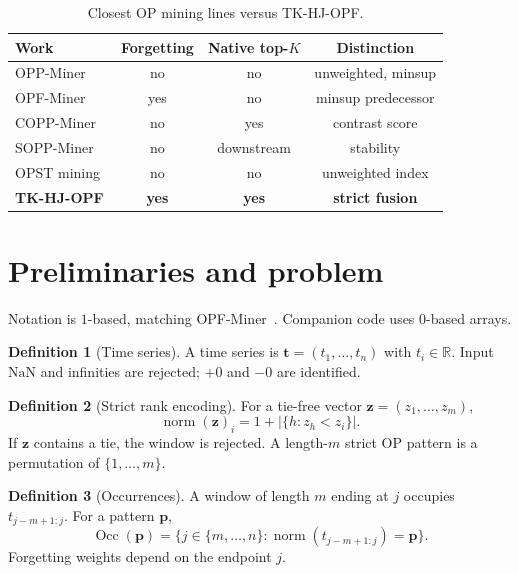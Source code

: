\documentclass[preprint,12pt]{elsarticle}
\DeclareMathOperator{\norm}{norm}
\DeclareMathOperator{\Occ}{Occ}
\theoremstyle{plain}
\theoremstyle{definition}
\newtheorem{definition}{Definition}
\theoremstyle{remark}
\begin{document}
\begin{table}[t]
\caption{Closest OP mining lines versus TK-HJ-OPF.}
\label{tab:related}
\centering
\footnotesize
\begin{tabular}{@{}lccc@{}}
\toprule
Work & Forgetting & Native top-$K$ & Distinction \\
\midrule
OPP-Miner~\cite{Wu2023OPP} & no & no & unweighted, minsup \\
OPF-Miner~\cite{Li2024OPF} & yes & no & minsup predecessor \\
COPP-Miner~\cite{Wu2024COPP} & no & yes & contrast score \\
SOPP-Miner~\cite{Zhang2026SOPP} & no & downstream & stability \\
OPST mining~\cite{Li2026Indexing} & no & no & unweighted index \\
\textbf{TK-HJ-OPF} & \textbf{yes} & \textbf{yes} & \textbf{strict fusion} \\
\bottomrule
\end{tabular}
\end{table}

\section{Preliminaries and problem}
\label{sec:prelim}

Notation is $1$-based, matching OPF-Miner~\cite{Li2024OPF}. Companion code uses $0$-based arrays.

\begin{definition}[Time series]
A time series is $\mathbf{t}=(t_1,\ldots,t_n)$ with $t_i\in\mathbb{R}$. Input $\mathrm{NaN}$ and infinities are rejected; $+0$ and $-0$ are identified.
\end{definition}

\begin{definition}[Strict rank encoding]
\label{def:strict}
For a tie-free vector $\mathbf{z}=(z_1,\ldots,z_m)$,
\begin{equation}
\label{eq:strict}
\norm(\mathbf{z})_i=1+\bigl|\{h:z_h<z_i\}\bigr|.
\end{equation}
If $\mathbf{z}$ contains a tie, the window is rejected. A length-$m$ strict OP pattern is a permutation of $\{1,\ldots,m\}$.
\end{definition}

\begin{definition}[Occurrences]
\label{def:occ}
A window of length $m$ ending at $j$ occupies $t_{j-m+1:j}$. For a pattern $\mathbf{p}$,
\begin{equation}
\label{eq:occ}
\Occ(\mathbf{p})=\bigl\{j\in\{m,\ldots,n\}:\norm(t_{j-m+1:j})=\mathbf{p}\bigr\}.
\end{equation}
Forgetting weights depend on the endpoint $j$.
\end{definition}
\end{document}
